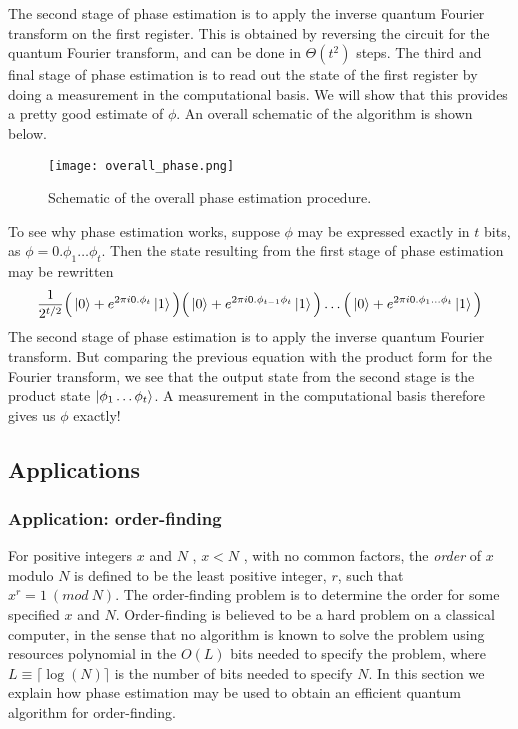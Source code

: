 The second stage of phase estimation is to apply the inverse quantum Fourier transform on the first register. This is obtained by reversing the circuit for the quantum Fourier transform, and can be done in $\Theta(t^2)$ steps. The third and final stage of phase estimation is to read out the state of the first register by doing a measurement in the computational basis. We will show that this provides a pretty good estimate of $\phi$. An overall schematic of the algorithm is shown below.
\begin{figure}[h]
    \centering
    \texttt{[image: overall\_phase.png]}
    \caption{Schematic of the overall phase estimation procedure.}
\end{figure}

\newpage
To see why phase estimation works, suppose $\phi$ may be expressed exactly in $t$ bits, as $\phi = 0.\phi_1\dots\phi_t$. Then the state resulting from the first stage of phase estimation may be rewritten
$$\frac{1}{2^{t/2}}\Big(\ket{0} + e^{2\pi i0.\phi_t}\ket{1}\Big)\Big(\ket{0} + e^{2\pi i0.\phi_{t-1}\phi_t}\ket{1}\Big)\dots\Big(\ket{0} + e^{2\pi i0.\phi_1\dots\phi_t}\ket{1}\Big)$$
The second stage of phase estimation is to apply the inverse quantum Fourier transform. But comparing the previous equation with the product form for the Fourier transform, we see that the output state from the second stage is the product state $\ket{\phi_1\dots\phi_t}$. A measurement in the computational basis therefore gives us $\phi$ exactly!

\subsection{Applications}

\subsubsection{Application: order-finding}

For positive integers $x$ and $N$ , $x < N$ , with no common factors, the \textit{order} of $x$ modulo $N$ is defined to be the least positive integer, $r$, such that $x^r = 1\ (mod\ N)$. The order-finding problem is to determine the order for some specified $x$ and $N$. Order-finding is believed to be a hard problem on a classical computer, in the sense that no algorithm is known to solve the problem using resources polynomial in the $O(L)$ bits needed to specify the problem, where $L \equiv \lceil\log(N)\rceil$ is the number of bits needed to specify $N$. In this section we explain how phase estimation may be used to obtain an efficient quantum algorithm for order-finding.
\vspace{1em}

